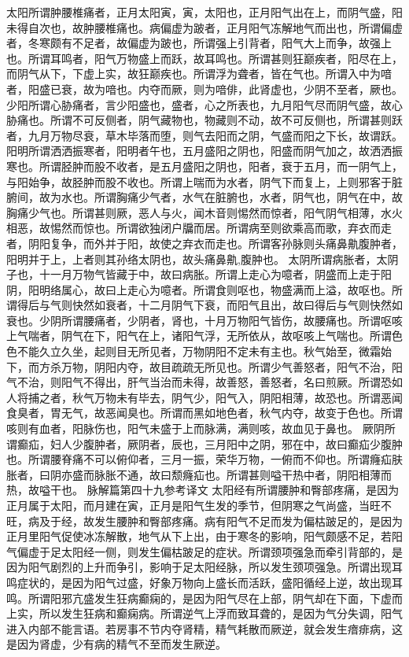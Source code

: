 \documentclass[a4paper,12pt,UTF8,twoside]{ctexbook}
\begin{document}
太阳所谓肿腰椎痛者，正月太阳寅，寅，太阳也，正月阳气出在上，而阴气盛，阳未得自次也，故肿腰椎痛也。病偏虚为跛者，正月阳气冻解地气而出也，所谓偏虚者，冬寒颇有不足者，故偏虚为跛也，所谓强上引背者，阳气大上而争，故强上也。所谓耳鸣者，阳气万物盛上而跃，故耳鸣也。所谓甚则狂巅疾者，阳尽在上，而阴气从下，下虚上实，故狂巅疾也。所谓浮为聋者，皆在气也。所谓入中为喑者，阳盛已衰，故为喑也。内夺而厥，则为喑俳，此肾虚也，少阴不至者，厥也。
少阳所谓心胁痛者，言少阳盛也，盛者，心之所表也，九月阳气尽而阴气盛，故心胁痛也。所谓不可反侧者，阴气藏物也，物藏则不动，故不可反侧也，所谓甚则跃者，九月万物尽衰，草木毕落而堕，则气去阳而之阴，气盛而阳之下长，故谓跃。
阳明所谓洒洒振寒者，阳明者午也，五月盛阳之阴也，阳盛而阴气加之，故洒洒振寒也。所谓胫肿而股不收者，是五月盛阳之阴也，阳者，衰于五月，而一阴气上，与阳始争，故胫肿而股不收也。所谓上喘而为水者，阴气下而复上，上则邪客于脏腑间，故为水也。所谓胸痛少气者，水气在脏腑也，水者，阴气也，阴气在中，故胸痛少气也。所谓甚则厥，恶人与火，闻木音则惕然而惊者，阳气阴气相薄，水火相恶，故惕然而惊也。所谓欲独闭户牖而居。所谓病至则欲乘高而歌，弃衣而走者，阴阳复争，而外并于阳，故使之弃衣而走也。所谓客孙脉则头痛鼻鼽腹肿者，阳明并于上，上者则其孙络太阴也，故头痛鼻鼽,腹肿也。
太阴所谓病胀者，太阴子也，十一月万物气皆藏于中，故曰病胀。所谓上走心为噫者，阴盛而上走于阳阴，阳明络属心，故曰上走心为噫者。所谓食则呕也，物盛满而上溢，故呕也。所谓得后与气则快然如衰者，十二月阴气下衰，而阳气且出，故曰得后与气则快然如衰也。少阴所谓腰痛者，少阴者，肾也，十月万物阳气皆伤，故腰痛也。所谓呕咳上气喘者，阴气在下，阳气在上，诸阳气浮，无所依从，故呕咳上气喘也。所谓色色不能久立久坐，起则目无所见者，万物阴阳不定未有主也。秋气始至，微霜始下，而方杀万物，阴阳内夺，故目疏疏无所见也。所谓少气善怒者，阳气不治，阳气不治，则阳气不得出，肝气当治而未得，故善怒，善怒者，名曰煎厥。所谓恐如人将捕之者，秋气万物未有毕去，阴气少，阳气入，阴阳相薄，故恐也。所谓恶闻食臭者，胃无气，故恶闻臭也。所谓而黑如地色者，秋气内夺，故变于色也。所谓咳则有血者，阳脉伤也，阳气未盛于上而脉满，满则咳，故血见于鼻也。
厥阴所谓癫疝，妇人少腹肿者，厥阴者，辰也，三月阳中之阴，邪在中，故曰癫疝少腹肿也。所谓腰脊痛不可以俯仰者，三月一振，荣华万物，一俯而不仰也。所谓癃疝肤胀者，曰阴亦盛而脉胀不通，故曰颓癃疝也。所谓甚则嗌干热中者，阴阳相薄而热，故嗌干也。
脉解篇第四十九参考译文
太阳经有所谓腰肿和臀部疼痛，是因为正月属于太阳，而月建在寅，正月是阳气生发的季节，但阴寒之气尚盛，当旺不旺，病及于经，故发生腰肿和臀部疼痛。病有阳气不足而发为偏枯跛足的，是因为正月里阳气促使冰冻解散，地气从下上出，由于寒冬的影响，阳气颇感不足，若阳气偏虚于足太阳经一侧，则发生偏枯跛足的症状。所谓颈项强急而牵引背部的，是因为阳气剧烈的上升而争引，影响于足太阳经脉，所以发生颈项强急。所谓出现耳鸣症状的，是因为阳气过盛，好象万物向上盛长而活跃，盛阳循经上逆，故出现耳鸣。所谓阳邪亢盛发生狂病癫痫的，是因为阳气尽在上部，阴气却在下面，下虚而上实，所以发生狂病和癫痫病。所谓逆气上浮而致耳聋的，是因为气分失调，阳气进入内部不能言语。若房事不节内夺肾精，精气耗散而厥逆，就会发生瘖痱病，这是因为肾虚，少有病的精气不至而发生厥逆。
\end{document}
